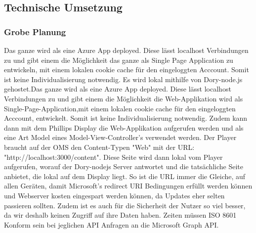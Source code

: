 
\subsection{Technische Umsetzung}
\subsubsection{Grobe Planung}
Das ganze wird als eine Azure App deployed. Diese lässt localhost Verbindungen zu und gibt einem die Möglichkeit das ganze als Single Page Application zu entwickeln, mit einem lokalen cookie cache für den eingeloggten Acccount. Somit ist keine Individualisierung notwendig.
\newline
Es wird lokal mithilfe von Dory-node.js gehostet.Das ganze wird als eine Azure App deployed. Diese lässt localhost Verbindungen zu und gibt einem die Möglichkeit die Web-Applikation wird als Single-Page-Application,mit einem lokalen cookie cache für den eingeloggten Acccount, entwickelt. Somit ist keine Individualisierung notwendig.
Zudem kann dann mit dem Phillips Display die Web-Applikation aufgerufen werden und als eine Art Model eines Model-View-Controller's verwendet werden.
\newline
Der Player braucht auf der OMS den Content-Typen "Web" mit der URL: "http://localhost:3000/content". Diese Seite wird dann lokal vom Player aufgerufen, worauf der Dory-nodejs Server antwortet und die tatsächliche Seite anbietet, die lokal auf dem Display liegt. So ist die URL immer die Gleiche, auf allen Geräten, damit Microsoft's redirect URI Bedingungen erfüllt werden können und Webserver kosten eingespart werden können, da Updates eher selten passieren sollten.
\newline
Zudem ist es auch für die Sicherheit der Nutzer so viel besser, da wir deshalb keinen Zugriff auf ihre Daten haben.
Zeiten müssen ISO 8601 Konform sein bei jeglichen API Anfragen an die Microsoft Graph API.
\newline
\pagebreak
